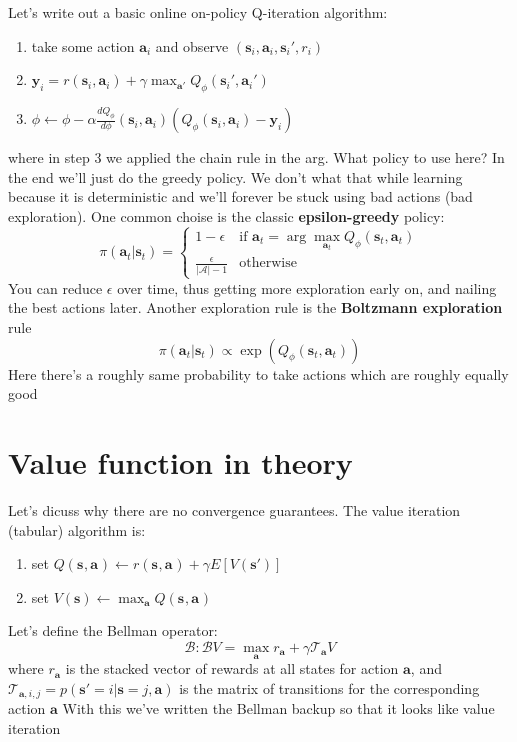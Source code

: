 \documentclass{report}
\newcommand{\argmax}{\arg\!\max}
\begin{document}
Let's write out a basic online on-policy Q-iteration algorithm:
\begin{enumerate}
\label{eq:online_q_iteration_algorithm}
\item take some action $\bm{a}_i$ and observe $\left( \bm{s}_i, \bm{a}_i, \bm{s}_i', r_i \right) $
\item $ \bm{y}_i = r(\bm{s}_{i}, \bm{a}_{i}) + \gamma \max_{\bm{a}'} Q_\phi (\bm{s}_{i}', \bm{a}_{i}') $
\item $ \phi \leftarrow \phi  - \alpha \frac{d Q_\phi}{d\phi} (\bm{s}_{i}, \bm{a}_{i}) \left( Q_\phi(\bm{s}_{i}, \bm{a}_{i}) - \bm{y}_i \right)  $
\end{enumerate}
where in step 3 we applied the chain rule in the arg.
What policy to use here? In the end we'll just do the greedy policy.
We don't what that while learning because it is deterministic and we'll forever be stuck using bad actions (bad exploration).
One common choise is the classic \textbf{epsilon-greedy} policy:
\begin{equation}
\pi(\bm{a}_{t}| \bm{s}_{t}) = 
\left\{
		\begin{array}{ll}
				1 - \epsilon & \text{if } \bm{a}_t = \argmax_{\bm{a}_t} Q_\phi(\bm{s}_{t}, \bm{a}_{t}) \\
				\frac{\epsilon}{|\mathcal{A}| - 1} & \text{otherwise}
\end{array}
		\right.
\end{equation}
You can reduce $\epsilon$ over time, thus getting more exploration early on, and nailing the best actions later.
Another exploration rule is the \textbf{Boltzmann exploration} rule
\begin{equation}
\pi(\bm{a}_{t}| \bm{s}_{t}) \propto \exp \left( Q_\phi(\bm{s}_{t}, \bm{a}_{t}) \right) 
\end{equation}
Here there's a roughly same probability to take actions which are roughly equally good

\section{Value function in theory}
Let's dicuss why there are no convergence guarantees.
The value iteration (tabular) algorithm is:
\begin{enumerate}
		\item set $Q(\bm{s}_{}, \bm{a}_{}) \leftarrow r(\bm{s}_{}, \bm{a}_{}) + \gamma E[V(\bm{s}')] $
		\item set $V(\bm{s}) \leftarrow \max_{\bm{a}} Q(\bm{s}_{}, \bm{a}_{})$
\end{enumerate}
Let's define the Bellman operator:
\begin{equation}
		\mathcal{B}: \mathcal{B}V = \max_{\bm{a}} r_{\bm{a}} + \gamma \mathcal{T}_{\bm{a}}V
\end{equation}
where $r_{\bm{a}}$ is the stacked vector of rewards at all states for action $\bm{a}$,
and $\mathcal{T}_{\bm{a},i,j} = p (\bm{s}' = i | \bm{s} = j, \bm{a}) $ is the matrix of transitions for the corresponding action $\bm{a}$  
With this we've written the Bellman backup so that it looks like value iteration
\end{document}
